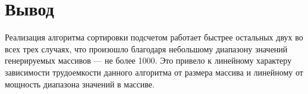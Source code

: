 \FloatBarrier

\section*{Вывод}

Реализация алгоритма сортировки подсчетом работает быстрее остальных двух во всех трех случаях, что произошло благодаря небольшому диапазону значений генерируемых массивов --- не более 1000. Это привело к линейному характеру зависимости трудоемкости данного алгоритма от размера массива и линейному от мощность диапазона значений в массиве.


